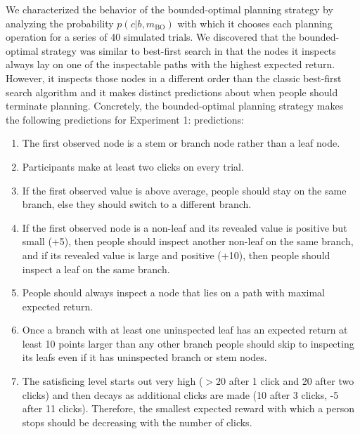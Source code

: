 We characterized the behavior of the bounded-optimal planning strategy by analyzing the probability $p(c|b,m_{\text{BO}})$ with which it chooses each planning operation for a series of 40 simulated trials. We discovered that the bounded-optimal strategy was similar to best-first search in that the nodes it inspects always lay on one of the inspectable paths with the highest expected return. However, it inspects those nodes in a different order than the classic best-first search algorithm and it makes distinct predictions about when people should terminate planning. Concretely, the bounded-optimal planning strategy makes the following predictions for Experiment 1:
predictions:
\begin{enumerate}
    \item  The first observed node is a stem or branch node rather than a leaf node.
    \item Participants make at least two clicks on every trial.
    \item If the first observed value is above average, people should stay on the same branch, else they should switch to a different branch.
    \item If the first observed node is a non-leaf and its revealed value is positive but small (+5), then people should inspect another non-leaf on the same branch, and if its revealed value is large and positive (+10), then people should inspect a leaf on the same branch.
    \item People should always inspect a node that lies on a path with maximal expected return.
    \item Once a branch with at least one uninspected leaf has an expected return at least 10 points larger than any other branch people should skip to inspecting its leafs even if it has uninspected branch or stem nodes.
    \item The satisficing level starts out very high ($>20$ after 1 click and 20 after two clicks) and then decays as additional clicks are made (10 after 3 clicks, -5 after 11 clicks). Therefore, the smallest expected reward with which a person stops should be decreasing with the number of clicks.
\end{enumerate}


